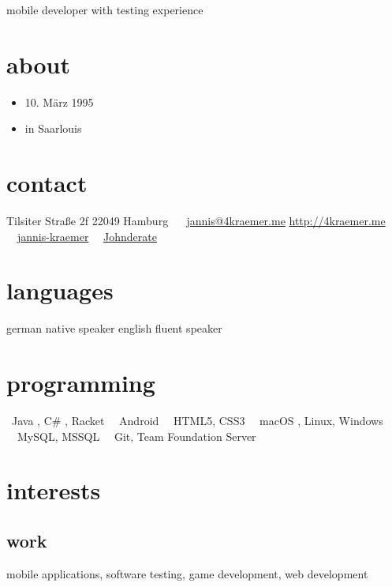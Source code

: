 \documentclass[]{friggeri-cv}
\begin{document}
       {mobile developer with testing experience}


\onehalfspace

\begin{aside}
  \section{about}
  \begin{itemize}[leftmargin=0pt,align=center,labelsep=1.5em]
      \item[{\FA \symbol{"F1FD}}] 10. März 1995
      \item[] in Saarlouis
  \end{itemize}

  \section{contact}
    Tilsiter Straße 2f
    22049 Hamburg
    ~
    \faEnvelope \ \href{mailto:jannis@4kraemer.me}{jannis@4kraemer.me}
    \href{http://4kraemer.me}{http://4kraemer.me}
    \faLinkedin \ \ \href{http://linkedin.com/in/jannis-kraemer}{jannis-kraemer}
    \faGithub \ \ \href{https://github.com/Johnderate}{Johnderate}
    ~
  \section{languages}
    german native speaker
    english fluent speaker
    ~
  \section{programming}
    \faCode \ Java {\color{red} \faHeart}, C\# {\color{red} \faHeart}, Racket
    \faMobile \ \ Android {\color{red} \faHeart}
     \ \ HTML5, CSS3
    \faLaptop \ \ macOS {\color{red} \faHeart}, Linux, Windows
    \faDatabase \ \ MySQL, MSSQL
    \faCodeFork \ \ Git, Team Foundation Server
\end{aside}

\section{interests}
  \subsection{work}
    mobile applications, software testing, game development, web development
\end{document}
